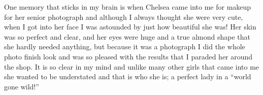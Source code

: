 One memory that sticks in my brain is when Chelsea came into me for makeup for
her senior photograph and although I always thought she were very cute, when
I got into her face I was astounded by just how beautiful she was!  Her skin
was so perfect and clear, and her eyes were huge and a true almond shape that
she hardly needed anything,  but because it was a photograph I did the whole
photo finish look and was so pleased with the results that I paraded her around
the shop. It is so clear in my mind and unlike many other girls that came into
me she wanted to be understated and that is who she is; a perfect lady in
a ``world gone wild!''
